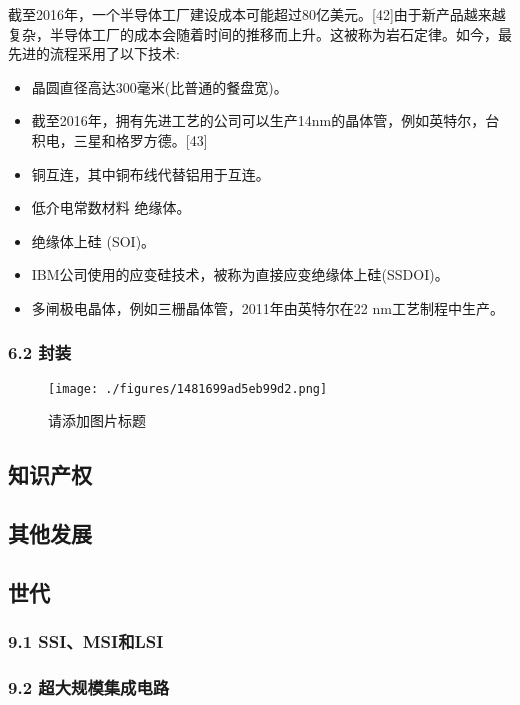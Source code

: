 截至2016年，一个半导体工厂建设成本可能超过80亿美元。[42]由于新产品越来越复杂，半导体工厂的成本会随着时间的推移而上升。这被称为岩石定律。如今，最先进的流程采用了以下技术:

\begin{itemize}
\item 晶圆直径高达300毫米(比普通的餐盘宽)。
\item 截至2016年，拥有先进工艺的公司可以生产14nm的晶体管，例如英特尔，台积电，三星和格罗方德。[43]
\item 铜互连，其中铜布线代替铝用于互连。
\item 低介电常数材料 绝缘体。
\item 绝缘体上硅 (SOI)。
\item IBM公司使用的应变硅技术，被称为直接应变绝缘体上硅(SSDOI)。
\item 多闸极电晶体，例如三栅晶体管，2011年由英特尔在22 nm工艺制程中生产。
\end{itemize}

\subsubsection{6.2 封装}

\begin{figure}[ht]
\centering
\texttt{[image: ./figures/1481699ad5eb99d2.png]}
\caption{请添加图片标题} \label{fig_icJCDL_7}
\end{figure}


\subsection{知识产权}



\subsection{其他发展}



\subsection{世代}



\subsubsection{9.1 SSI、MSI和LSI}



\subsubsection{9.2 超大规模集成电路}



